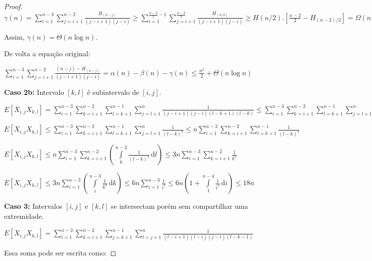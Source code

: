 \documentclass[dissertacao, brazil]{ThesisPUC}
\begin{document}
\begin{proof}
$\gamma(n) =  \sum\limits_{i=1}^{n-3} \sum\limits_{j=i+1}^{n-2} \frac{H_{(n - j)}} {(j-i+1)(j-i)}
\geq  \sum\limits_{i=1}^{\frac{n-2}{2} - 1} \sum\limits_{j=i+1}^{\frac{n-2}{2}} \frac{H_{(n/2)}} {(j-i+1)(j-i)}
\geq  H(n/2) . \left[\frac{n-2}{2} - H_{(n-2)/2} \right] = \Omega(n \log n) $

Assim, $\gamma(n) = \Theta(n \log n)$.


De volta a equação original:

$\sum\limits_{i=1}^{n-3} \sum\limits_{j=i+1}^{n-2} \frac{(n - j) - H_{(n - j)}} {(j-i+1)(j-i)} 
= \alpha(n) - \beta(n) - \gamma(n)
\leq  \frac{n^2}{2} + \Theta(n \log n)$

\vspace{0.5cm}

{\bf Caso 2b:} Intervalo $[k, l]$ é subintervalo de $[i, j]$.

$E[X_{i,j} X_{k,l}] = \sum\limits_{i=1}^{n-3} \sum\limits_{k=i+1}^{n-2}
\sum\limits_{l=k+1}^{n-1} \sum\limits_{j=l+1}^{n} \frac{1}{(j-i+1)(j-i)(l-k+1)(l-k)}
\leq  \sum\limits_{i=1}^{n-3} \sum\limits_{k=i+1}^{n-2}
\sum\limits_{l=k+1}^{n-1} \sum\limits_{j=l+1}^{n} \frac{1}{(l-k+1)(l-k)(l-k+1)(l-k)}$

$E[X_{i,j} X_{k,l}] \leq\sum\limits_{i=1}^{n-3} \sum\limits_{k=i+1}^{n-2}
\sum\limits_{l=k+1}^{n-1} \sum\limits_{j=l+1}^{n} \frac{1}{(l-k)^4}
\leq n \sum\limits_{i=1}^{n-3} \sum\limits_{k=i+1}^{n-2}
\sum\limits_{l=k+1}^{n-1}  \frac{1}{(l-k)^4} $

$E[X_{i,j} X_{k,l}] \leq n \sum\limits_{i=1}^{n-3} \sum\limits_{k=i+1}^{n-2}
\left( \displaystyle \int\limits_{k}^{n-2} \! \frac{1}{(l-k)^4} \, \mathrm{d}l \right)
\leq 3n \sum\limits_{i=1}^{n-3} \sum\limits_{k=i+1}^{n-2} \frac{1}{k^3} $

$E[X_{i,j} X_{k,l}]  \leq 3n \sum\limits_{i=1}^{n-3}
\left( \displaystyle \int\limits_{i}^{n-3} \! \frac{1}{k^3} \, \mathrm{d}k \right)
\leq 6n \sum\limits_{i=1}^{n-3} \frac{1}{i^2}
 \leq 6n \left( 1 + \displaystyle \int\limits_{1}^{n-4} \! \frac{1}{i^2} \, \mathrm{d}i \right)
 \leq 18n$

\vspace{0.5cm}

{\bf Caso 3:} Intervalos $[i, j]$ e $[k, l]$ se intersectam porém sem compartilhar uma extremidade.

$E[X_{i,j} X_{k,l}] = \sum\limits_{i=1}^{n-3} \sum\limits_{k=i+1}^{n-2}
\sum\limits_{j=k+1}^{n-1} \sum\limits_{l=j+1}^{n} \frac{1}{(l-i+1)(l-i)(j-i)(l-k-1)}$

Essa soma pode ser escrita como:


\end{proof}
\end{document}
